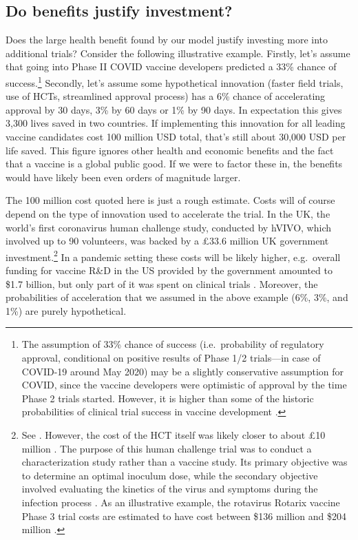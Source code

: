 \documentclass{article}
\begin{document}
\subsection{Do benefits justify investment?}\label{do-benefits-justify-investment}

Does the large health benefit found by our model justify investing more into additional trials? Consider the following illustrative example. Firstly, let's assume that going into Phase II COVID vaccine developers predicted a 33\% chance of success.\footnote{The assumption of 33\% chance of success (i.e.~probability of regulatory approval, conditional on positive results of Phase 1/2 trials---in case of COVID-19 around May 2020) may be a slightly conservative assumption for COVID, since the vaccine developers were optimistic of approval by the time Phase 2 trials started. However, it is higher than some of the historic probabilities of clinical trial success in vaccine development \citep{Gouglas2018Estimating}.} Secondly, let's assume some hypothetical innovation (faster field trials, use of HCTs, streamlined approval process) has a 6\% chance of accelerating approval by 30 days, 3\% by 60 days or 1\% by 90 days. In expectation this gives 3,300 lives saved in two countries. If implementing this innovation for all leading vaccine candidates cost 100 million USD total, that's still about 30,000 USD per life saved. This figure ignores other health and economic benefits and the fact that a vaccine is a global public good. If we were to factor these in, the benefits would have likely been even orders of magnitude larger.

The 100 million cost quoted here is just a rough estimate. Costs will of course depend on the type of innovation used to accelerate the trial. In the UK, the world's first coronavirus human challenge study, conducted by hVIVO, which involved up to 90 volunteers, was backed by a £33.6 million UK government investment.\footnote{See \citet{DBEI2021World}. However, the cost of the HCT itself was likely closer to about £10 million \citep{Shares2020Open}. The purpose of this human challenge trial was to conduct a characterization study rather than a vaccine study. Its primary objective was to determine an optimal inoculum dose, while the secondary objective involved evaluating the kinetics of the virus and symptoms during the infection process \citep{Killingley2022Safety}. As an illustrative example, the rotavirus Rotarix vaccine Phase 3 trial costs are estimated to have cost between \$136 million and \$204 million \citep{Light2009Estimated}.} In a pandemic setting these costs will be likely higher, e.g.~overall funding for vaccine R\&D in the US provided by the government amounted to \$1.7 billion, but only part of it was spent on clinical trials \citep{Lalani2023US}. Moreover, the probabilities of acceleration that we assumed in the above example (6\%, 3\%, and 1\%) are purely hypothetical.
\end{document}
